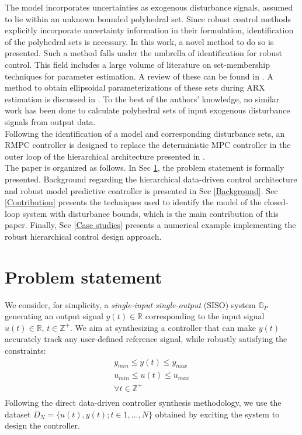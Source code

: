 \documentclass[letterpaper, 10 pt, conference]{ieeeconf}  %
\begin{document}
 The model incorporates uncertainties as exogenous disturbance signals, assumed to lie within an unknown bounded polyhedral set. Since robust control methods explicitly incorporate uncertainty information in their formulation, identification of the polyhedral sets is necessary.  In this work, a novel method to do so is presented. Such a method falls under the umbrella of identification for robust control.
This field includes a large volume of literature on set-membership techniques for parameter estimation. A review of these can be found in \cite{WALTER1990449}. A method to obtain ellipsoidal parameterizations of these sets during ARX estimation is discussed in \cite{7330793}. To the best of the authors' knowledge, no similar work has been done to calculate polyhedral sets of input exogenous disturbance signals from output data.
 \\ \indent
  Following the identification of a model and corresponding disturbance sets, an RMPC controller is designed to replace the deterministic MPC controller in the outer loop of the hierarchical architecture presented in \cite{7932940}.
 \\ \indent
 The paper is organized as follows. In Sec \ref{Problem statement}, the problem statement is formally presented. Background regarding the hierarchical data-driven control architecture and robust model predictive controller is presented in Sec \ref{Background}. Sec \ref{Contribution} presents the techniques used to identify the model of the closed-loop system with disturbance bounds, which is the main contribution of this paper. Finally, Sec \ref{Case studies} presents a numerical example implementing the robust hierarchical control design approach. 

\section{Problem statement}
\label{Problem statement}
We consider, for simplicity, a \textit{single-input single-output} (SISO) system $\mathbb{G}_P$ generating an output signal $y(t) \in \mathbb{R}$ corresponding to the input signal $u(t) \in \mathbb{R}$, $t \in \mathbb{Z}^+$. We aim at synthesizing a controller that can make $y(t)$ accurately track any user-defined reference signal, while robustly satisfying the constraints:
\begin{equation} 
\begin{matrix}
y_{min}\leq y(t) \leq y_{max}\\
u_{min}\leq u(t) \leq u_{max} \\
\forall t \in \mathbb{Z}^+\\
\end{matrix}
\label{constraints}
\end{equation} 
Following the direct data-driven controller synthesis methodology, we use the dataset $D_{N}=\{u(t),y(t);t\in{1,...,N}\}$ obtained by exciting the system to design the controller.
\end{document}
